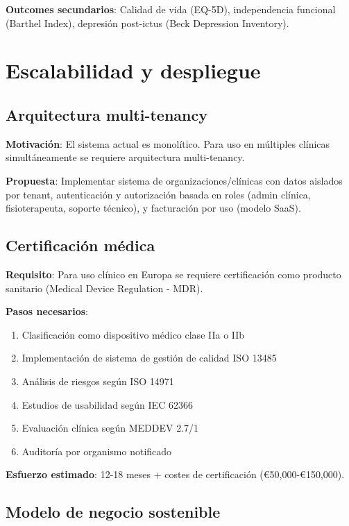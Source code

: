 \textbf{Outcomes secundarios}: Calidad de vida (EQ-5D), independencia funcional (Barthel Index), depresión post-ictus (Beck Depression Inventory).

\section{Escalabilidad y despliegue}

\subsection{Arquitectura multi-tenancy}

\textbf{Motivación}: El sistema actual es monolítico. Para uso en múltiples clínicas simultáneamente se requiere arquitectura multi-tenancy.

\textbf{Propuesta}: Implementar sistema de organizaciones/clínicas con datos aislados por tenant, autenticación y autorización basada en roles (admin clínica, fisioterapeuta, soporte técnico), y facturación por uso (modelo SaaS).

\subsection{Certificación médica}

\textbf{Requisito}: Para uso clínico en Europa se requiere certificación como producto sanitario (Medical Device Regulation - MDR).

\textbf{Pasos necesarios}:
\begin{enumerate}
    \item Clasificación como dispositivo médico clase IIa o IIb
    \item Implementación de sistema de gestión de calidad ISO 13485
    \item Análisis de riesgos según ISO 14971
    \item Estudios de usabilidad según IEC 62366
    \item Evaluación clínica según MEDDEV 2.7/1
    \item Auditoría por organismo notificado
\end{enumerate}

\textbf{Esfuerzo estimado}: 12-18 meses + costes de certificación (€50,000-€150,000).

\subsection{Modelo de negocio sostenible}

